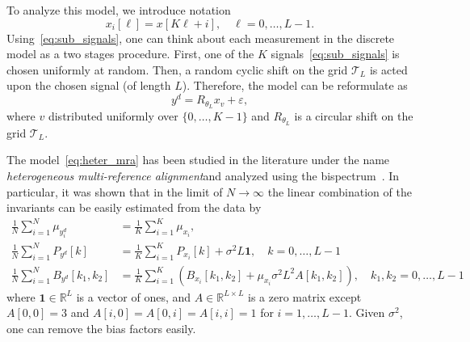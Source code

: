 \documentclass[english,12pt]{article}
\newcommand{\R}{\mathbb{R}}
\newcommand{\T}{\mathcal{T}}
\newcommand{\TODO}[1]{{\color{red}{[#1]}}}
\numberwithin{equation}{section}
\numberwithin{thm}{section} %
\begin{document}
To analyze this model, we introduce notation
\begin{equation} \label{eq:sub_signals}
x_i[\ell] = x[K\ell + i], \quad \ell=0,\ldots,L-1.
\end{equation}
Using~\eqref{eq:sub_signals}, one can think about each measurement in the discrete model 
as a two stages procedure. First, one of the $K$ signals~\eqref{eq:sub_signals} is chosen uniformly at random. Then, a random cyclic shift on the grid $\T_L$ is acted upon the chosen signal (of length $L$).
Therefore, the model can be reformulate  as 
\begin{equation} \label{eq:heter_mra}
y^d =  R_{\theta_{L}} x_{v} + \varepsilon,
\end{equation}
where $v$ distributed uniformly over $\{0,\ldots,K-1\}$ and $R_{\theta_L}$ is a circular shift on the grid $\T_L$. 

The model~\eqref{eq:heter_mra} has been studied in the literature under the name \emph{heterogeneous multi-reference alignment}and analyzed using the bispectrum~\cite{perry2017sample,bandeira2017estimation,boumal2018heterogeneous}. %
In particular, it was shown that in the limit of $N\to\infty$ the linear combination of the invariants can be easily estimated from the data by 
\begin{align} \label{eq:mix_invariants}
\frac{1}{N}\sum_{i=1}^N \mu_{y_i^d} &= \frac{1}{K}\sum_{i=1}^K \mu_{x_i}, \nonumber\\
\frac{1}{N}\sum_{i=1}^N  P_{y^d}[k] &= \frac{1}{K}\sum_{i=1}^K P_{x_i}[k] + \sigma^2L\mathbf{1}, \quad k=0,\ldots,L-1\\
\frac{1}{N}\sum_{i=1}^N B_{y^d}[k_1,k_2] &= \frac{1}{K}\sum_{i=1}^K (B_{x_i} [k_1,k_2]+\mu_{x_i}\sigma^2L^2 A[k_1,k_2] ), \quad  k_1,k_2=0,\ldots,L-1 \nonumber
\end{align}
where $\mathbf{1}\in\mathbb{R}^L$ is a vector of ones, and $A\in\mathbb{R}^{L\times L}$ is a zero matrix except $A[0,0]=3$ and $A[i,0]=A[0,i]=A[i,i]=1$ for $i=1,\ldots,L-1$.
Given $\sigma^2$, one can remove the bias factors easily. 
\end{document}
